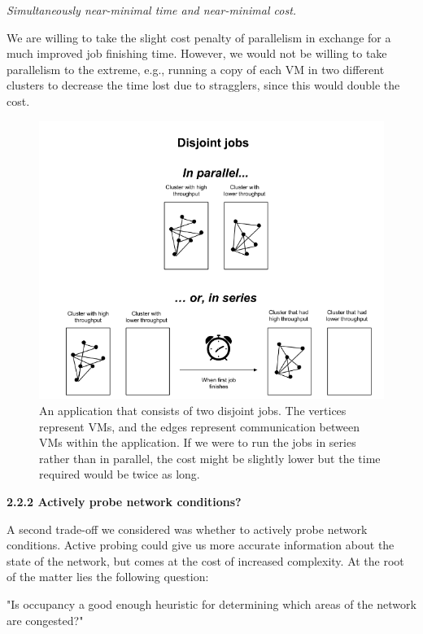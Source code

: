 \documentclass[11pt]{article}
\begin{document}
\textit{Simultaneously near-minimal time and near-minimal cost.}

We are willing to take the slight cost penalty of parallelism in exchange for a much improved job finishing time.  However, we would not be willing to take parallelism to the extreme, e.g., running a copy of each VM in two different clusters to decrease the time lost due to stragglers, since this would double the cost.

\begin{figure}[h!]
  \centering
\includegraphics[scale=0.65]{disjointjobs.png}

 \caption{ An application that consists of two disjoint jobs.  The vertices represent VMs, and the edges represent communication between VMs within the application.  If we were to run the jobs in series rather than in parallel, the cost might be slightly lower but the time required would be twice as long.}

\end{figure}


\FloatBarrier
\large{\textbf{2.2.2 Actively probe network conditions?}}

\normalsize

A second trade-off we considered was whether to actively probe network conditions.  Active probing could give us more accurate information about the state of the network, but comes at the cost of increased complexity.  At the root of the matter lies the following question:

"Is occupancy a good enough heuristic for determining which areas of the network are congested?"
\end{document}
